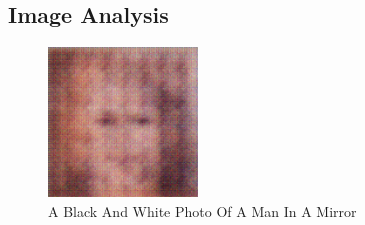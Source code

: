 \documentclass{article}%
\begin{document}
%
\subsection{Image Analysis}%
\label{subsec:ImageAnalysis}%


\begin{figure}[h!]%
\centering%
\includegraphics[width=150px]{500_fake_images/samples_5_228.png}%
\caption{A Black And White Photo Of A Man In A Mirror}%
\end{figure}

%
\end{document}
